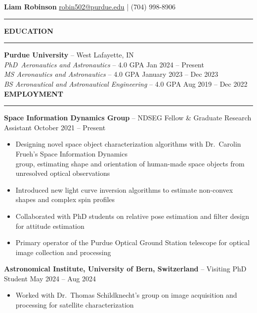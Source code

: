 \documentclass[10pt, a4paper]{article}
\newcommand{\sectiontitle}[1]{{\Large \textbf{#1}}\vspace{0.5em}\hrule\vspace{0.5em}}
\begin{document}
\thispagestyle{empty}

\sffamily
\renewcommand*{\bibfont}{\normalfont\normalsize\sffamily}

\noindent
\textbf{\huge Liam Robinson} \hfill \href{mailto:robin502@purdue.edu}{robin502@purdue.edu} | (704) 998-8906
\rule{\linewidth}{4pt}
\vspace{-0.5em}

\sectiontitle{EDUCATION}
\textbf{Purdue University} -- West Lafayette, IN \\
\textit{PhD\ Aeronautics and Astronautics} -- 4.0 GPA \hfill Jan 2024 -- Present \\
\textit{MS \hspace{1px} Aeronautics and Astronautics} -- 4.0 GPA \hfill January 2023 -- Dec 2023 \\
\textit{BS \hspace{3px} Aeronautical and Astronautical Engineering} -- 4.0 GPA \hfill Aug 2019 -- Dec 2022 \\

\sectiontitle{EMPLOYMENT}
\textbf{Space Information Dynamics Group} -- NDSEG Fellow \& Graduate Research Assistant \hfill October 2021 -- Present
\begin{itemize}[noitemsep]
    \item Designing novel space object characterization algorithms with Dr.\ Carolin Frueh's Space Information Dynamics \\group, estimating shape and orientation of human-made space objects from unresolved optical observations
    \item Introduced new light curve inversion algorithms to estimate non-convex shapes and complex spin profiles
    \item Collaborated with PhD students on relative pose estimation and filter design for attitude estimation
    \item Primary operator of the Purdue Optical Ground Station telescope for optical image collection and processing
\end{itemize}

\textbf{Astronomical Institute, University of Bern, Switzerland} -- Visiting PhD Student \hfill May 2024 -- Aug 2024
\begin{itemize}[noitemsep]
    \item Worked with Dr.\ Thomas Schildknecht's group on image acquisition and processing for satellite characterization
\end{itemize}
\end{document}
